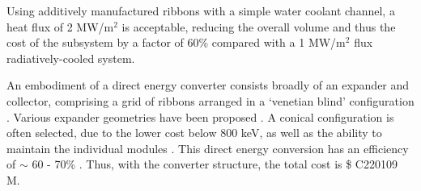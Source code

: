 Using additively manufactured ribbons with a simple water coolant channel, a heat flux of 2 MW/m$^2$ is acceptable, reducing the overall volume and thus the cost of the subsystem by a factor of 60\% compared with a 1 MW/m$^2$ flux radiatively-cooled system.\\


\begin{table}[ht]
    \centering
    \caption{Costs for the direct energy convertor subsystems.}
    \label{tab:cost-table}
\end{table}

An embodiment of a direct energy converter consists broadly of an expander and collector, comprising a grid of ribbons arranged in a `venetian blind' configuration \cite{post1970mirror}. Various expander geometries have been proposed \cite{post1970mirror}. A conical configuration is often selected, due to the lower cost below 800 keV, as well as the ability to maintain the individual modules \cite{barr1974preliminary}. This direct energy conversion has an efficiency of $\sim$ 60 - 70\% \cite{moir1973venetian}.   Thus, with the converter structure, the total cost is \$ C220109 M.
